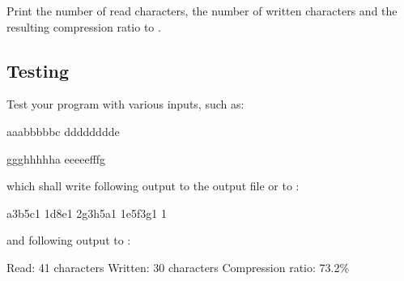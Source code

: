 Print the number of read characters, the number of written characters
and the resulting compression ratio to .


\subsection*{Testing}
Test your program with various inputs, such as:

\begin{osuefmtcode}
aaabbbbbc
dddddddde

ggghhhhha
eeeeefffg
\end{osuefmtcode}

which shall write following output to the output file or to :

\begin{osuefmtcode}
a3b5c1
1d8e1
2g3h5a1
1e5f3g1
1
\end{osuefmtcode}

and following output to :

\begin{osuefmtcode}
Read:      41 characters
Written:   30 characters
Compression ratio: 73.2\%
\end{osuefmtcode}

\osueguidelinesone



